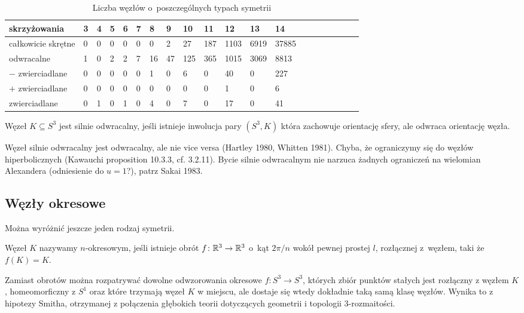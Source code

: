 \begin{table}[h]
    \centering
    \begin{tabular}{@{}*{20}l@{}} \toprule
        skrzyżowania & 3 & 4 & 5 & 6 & 7 & 8 & 9 & 10 & 11 & 12 & 13 & 14 \\ \midrule
        całkowicie skrętne & 0 & 0 & 0 & 0 & 0 & 0 & 2 & 27 & 187 & 1103 & 6919 & 37885 \\
        odwracalne & 1 & 0 & 2 & 2 & 7 & 16 & 47 & 125 & 365 & 1015 & 3069 & 8813 \\
        $-$ zwierciadlane & 0 & 0 & 0 & 0 & 0 & 1 & 0 & 6 & 0 & 40 & 0 & 227 \\
        $+$ zwierciadlane & 0 & 0 & 0 & 0 & 0 & 0 & 0 & 0 & 0 & 1 & 0 & 6 \\
        zwierciadlane & 0 & 1 & 0 & 1 & 0 & 4 & 0 & 7 & 0 & 17 & 0 & 41 \\
        \bottomrule
        \hline
    \end{tabular}
    \caption{Liczba węzłów o~poszczególnych typach symetrii}
\end{table}

\begin{tobedone}
    Węzeł $K \subseteq S^3$ jest silnie odwracalny, jeśli istnieje inwolucja pary $(S^3, K)$ która zachowuje orientację sfery, ale odwraca orientację węzła.
\end{tobedone}

Węzeł silnie odwracalny jest odwracalny, ale nie vice versa (Hartley 1980, Whitten 1981).
Chyba, że ograniczymy się do węzłów hiperbolicznych (Kawauchi proposition 10.3.3, cf. 3.2.11).
Bycie silnie odwracalnym nie narzuca żadnych ograniczeń na wielomian Alexandera (odniesienie do $u = 1$?), patrz Sakai 1983.

\subsection{Węzły okresowe}
Można wyróżnić jeszcze jeden rodzaj symetrii.

\begin{definition}
    \label{def:period}
    Węzeł $K$ nazywamy $n$-okresowym, jeśli istnieje obrót $f \colon \mathbb R^3 \to \mathbb R^3$ o~kąt $2\pi/n$ wokół pewnej prostej $l$, rozłącznej z~węzłem, taki że $f(K) = K$.
\end{definition}

Zamiast obrotów można rozpatrywać dowolne odwzorowania okresowe $f \colon S^3 \to S^3$, których zbiór punktów stałych jest rozłączny z węzłem $K$, homeomorficzny z $S^1$ oraz które trzymają węzeł $K$ w miejscu, ale dostaje się wtedy dokładnie taką samą klasę węzłów.
Wynika to z hipotezy Smitha, otrzymanej z połączenia głębokich teorii dotyczących geometrii i topologii 3-rozmaitości.

